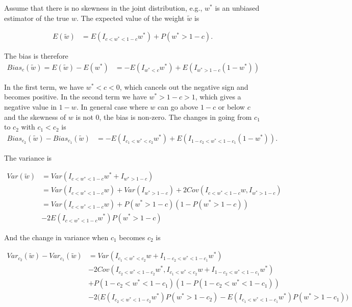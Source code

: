\documentclass[11pt]{article}
\begin{document}
Assume that there is no skewness in the joint distribution, e.g.,
\(w^*\) is an unbiased estimator of the true \(w\). The expected value of
the weight \(\tilde{w}\) is

\begin{equation}
\label{eqn: E w trunc}
\begin{aligned}
E(\tilde{w}) &= E(I_{c<w^*<1-c}w^*) + P(w^*>1-c).
\end{aligned}
\end{equation}

The bias is therefore
\begin{equation}
\label{eqn: bias w trunc}
\begin{aligned}
Bias_c(\tilde{w}) = E(\tilde{w}) - E(w^*) &= -E(I_{w^*<c}w^*)+E(I_{w^*>1-c}(1-w^*))
\end{aligned}
\end{equation}

In the first term, we have \(w^*<c<0\), which cancels out the negative
sign and becomes positive. In the second term we have \(w^*>1-c>1\), which
gives a negative value in \(1-w\). In general case where \(w\) can go
above \(1-c\) or below \(c\) and the skewness of \(w\) is not 0, the
bias is non-zero. The changes in going from $c_1$ to $c_2$ with $c_1<c_2$ is
\begin{equation}
\label{eqn: bias w trunc}
\begin{aligned}
Bias_{c_2}(\tilde{w})- Bias_{c_1}(\tilde{w}) &= -E(I_{c_1<w^*<c_2}w^*)+E(I_{1-c_2<w^*<1-c_1}(1-w^*)).
\end{aligned}
\end{equation}

The variance is

\begin{equation}
\label{eqn: var w trunc}
\begin{aligned}
Var(\tilde{w}) &= Var(I_{c<w^*<1-c}w^*+I_{w^*>1-c})\\
&=Var(I_{c<w^*<1-c}w) + Var(I_{w^*>1-c}) + 2 Cov(I_{c<w^*<1-c}w,I_{w^*>1-c})\\
&=Var(I_{c<w^*<1-c}w) + P(w^*>1-c)(1-P(w^*>1-c)) \\&- 2E(I_{c<w^*<1-c}w^*)P(w^*>1-c)
\end{aligned}
\end{equation}

And the change in variance when $c_1$ becomes $c_2$ is

\begin{equation}
\label{eqn: delta var w trunc 1}
\begin{aligned}
Var_{c_2}(\tilde{w}) - Var_{c_1}(\tilde{w}) &=Var(I_{c_1<w^*<c_2}w+I_{1-c_2<w^*<1-c_1}w^*)\\
&-2Cov(I_{c_2<w^*<1-c_2}w^*,I_{c_1<w^*<c_2}w+I_{1-c_2<w^*<1-c_1}w^*)\\
&+P(1-c_2<w^*<1-c_1)(1-P(1-c_2<w^*<1-c_1))\\
&-2\Big(E(I_{c_2<w^*<1-c_2}w^*)P(w^*>1-c_2)-E(I_{c_1<w^*<1-c_1}w^*)P(w^*>1-c_1)\Big)
\end{aligned}
\end{equation}
\end{document}
